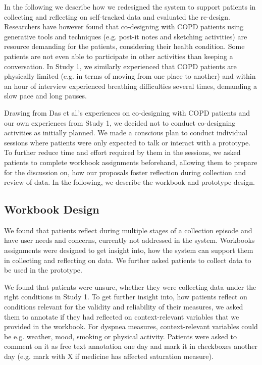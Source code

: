 In the following we describe how we redesigned the system to support patients in collecting and reflecting on self-tracked data and evaluated the re-design. Researchers have however found that co-designing with COPD patients using generative tools and techniques (e.g. post-it notes and sketching activities) are resource demanding for the patients, considering their health condition. Some patients are not even able to participate in other activities than keeping a conversation. In Study 1, we similarly experienced that COPD patients are physically limited (e.g. in terms of moving from one place to another) and within an hour of interview experienced breathing difficulties several times, demanding a slow pace and long pauses. 

Drawing from Das et al.’s experiences on co-designing with COPD patients \cite{Das} and our own experiences from Study 1, we decided not to conduct co-designing activities as initially planned. We made a conscious plan to conduct individual sessions where patients were only expected to talk or interact with a prototype. To further reduce time and effort required by them in the sessions, we asked patients to complete workbook assignments beforehand, allowing them to prepare for the discussion on, how our proposals foster reflection during collection and review of data. In the following, we describe the workbook and prototype design. 

\subsection{Workbook Design}
We found that patients reflect during multiple stages of a collection episode and have user needs and concerns, currently not addressed in the system. Workbooks assignments were designed to get insight into, how the system can support them in collecting and reflecting on data. We further asked patients to collect data to be used in the prototype. 

We found that patients were unsure, whether they were collecting data under the right conditions in Study 1. To get further insight into, how patients reflect on conditions relevant for the validity and reliability of their measures, we asked them to annotate if they had reflected on context-relevant variables that we provided in the workbook. For dyspnea measures, context-relevant variables could be e.g. weather, mood, smoking or physical activity. Patients were asked to comment on it as free text annotation one day and mark it in checkboxes another day (e.g. mark with X if medicine has affected saturation measure). 

